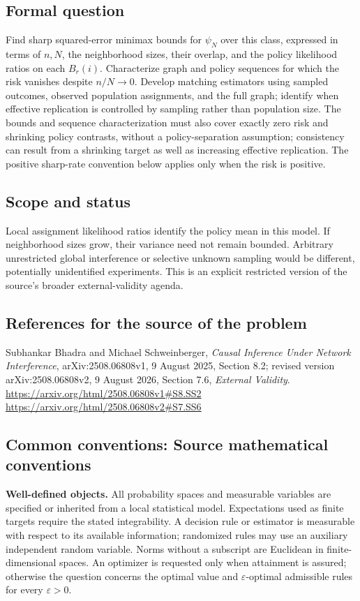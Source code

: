 \documentclass[11pt,a4paper]{article}
\begin{document}
\subsection*{Formal question}
Find sharp squared-error minimax bounds for $\psi_N$ over this class, expressed in terms of $n,N$, the neighborhood sizes, their overlap, and the policy likelihood ratios on each $B_r(i)$. Characterize graph and policy sequences for which the risk vanishes despite $n/N\to0$. Develop matching estimators using sampled outcomes, observed population assignments, and the full graph; identify when effective replication is controlled by sampling rather than population size. The bounds and sequence characterization must also cover exactly zero risk and shrinking policy contrasts, without a policy-separation assumption; consistency can result from a shrinking target as well as increasing effective replication. The positive sharp-rate convention below applies only when the risk is positive.
\subsection*{Scope and status}
Local assignment likelihood ratios identify the policy mean in this model. If neighborhood sizes grow, their variance need not remain bounded. Arbitrary unrestricted global interference or selective unknown sampling would be different, potentially unidentified experiments. This is an explicit restricted version of the source's broader external-validity agenda.
\subsection*{References for the source of the problem}
Subhankar Bhadra and Michael Schweinberger, \emph{Causal Inference Under Network Interference}, arXiv:2508.06808v1, 9 August 2025, Section 8.2; revised version arXiv:2508.06808v2, 9 August 2026, Section 7.6, \emph{External Validity}.
\url{https://arxiv.org/html/2508.06808v1#S8.SS2}
\url{https://arxiv.org/html/2508.06808v2#S7.SS6}

\subsection*{Common conventions: Source mathematical conventions}

\textbf{Well-defined objects.}
All probability spaces and measurable variables are specified or inherited
from a local statistical model. Expectations used as finite targets require
the stated integrability. A decision rule or estimator is measurable with
respect to its available information; randomized rules may use an auxiliary
independent random variable. Norms without a subscript are Euclidean in
finite-dimensional spaces. An optimizer is requested only when attainment
is assured; otherwise the question concerns the optimal value and
$\varepsilon$-optimal admissible rules for every $\varepsilon>0$.
\end{document}
